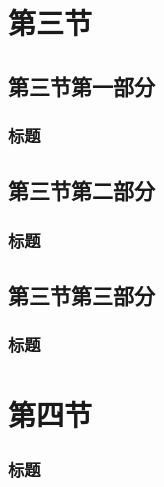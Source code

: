 \documentclass[xetex,mathserif,serif,handout]{beamer}
\begin{document}
	\section{第三节}
	\subsection{第三节第一部分}
	\begin{frame}
		\frametitle{标题}
	\end{frame}
	\subsection{第三节第二部分}
	\begin{frame}
		\frametitle{标题}
	\end{frame}
	\subsection{第三节第三部分}
	\begin{frame}
		\frametitle{标题}
	\end{frame}

	\section{第四节}
	\begin{frame}
		\frametitle{标题}
	\end{frame}
\end{document}
